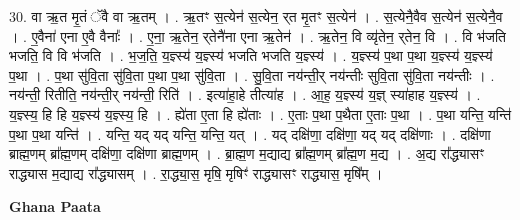 \documentclass[17pt]{extarticle}
\begin{document}
30. वा ऋ॒त मृ॒तं ॅवै वा ऋ॒तम् । . ऋ॒तꣳ स॒त्येन॑ स॒त्येन॒ र्‌त मृ॒तꣳ स॒त्येन॑ । . स॒त्येनै॒वैव स॒त्येन॑ स॒त्येनै॒व । . ए॒वैना॑ एना ए॒वै वैनाः᳚ । . ए॒ना॒ ऋ॒तेन॒ र्‌तेनै॑ना एना ऋ॒तेन॑ । . ऋ॒तेन॒ वि व्यृ॑तेन॒ र्‌तेन॒ वि । . वि भ॑जति भजति॒ वि वि भ॑जति । . भ॒ज॒ति॒ य॒ज्ञ्स्य॑ य॒ज्ञ्स्य॑ भजति भजति य॒ज्ञ्स्य॑ । . य॒ज्ञ्स्य॑ प॒था प॒था य॒ज्ञ्स्य॑ य॒ज्ञ्स्य॑ प॒था । . प॒था सु॑वि॒ता सु॑वि॒ता प॒था प॒था सु॑वि॒ता । . सु॒वि॒ता नय॑न्ती॒र् नय॑न्तीः सुवि॒ता सु॑वि॒ता नय॑न्तीः । . नय॑न्ती॒ रितीति॒ नय॑न्ती॒र् नय॑न्ती॒ रिति॑ । . इत्या॑हा॒हे तीत्या॑ह । . आ॒ह॒ य॒ज्ञ्स्य॑ य॒ज्ञ् स्या॑हाह य॒ज्ञ्स्य॑ । . य॒ज्ञ्स्य॒ हि हि य॒ज्ञ्स्य॑ य॒ज्ञ्स्य॒ हि । . ह्ये॑ता ए॒ता हि ह्ये॑ताः । . ए॒ताः प॒था प॒थैता ए॒ताः प॒था । . प॒था यन्ति॒ यन्ति॑ प॒था प॒था यन्ति॑ । . यन्ति॒ यद् यद् यन्ति॒ यन्ति॒ यत् । . यद् दक्षि॑णा॒ दक्षि॑णा॒ यद् यद् दक्षि॑णाः । . दक्षि॑णा ब्राह्म॒णम् ब्रा᳚ह्म॒णम् दक्षि॑णा॒ दक्षि॑णा ब्राह्म॒णम् । . ब्रा॒ह्म॒ण म॒द्याद्य ब्रा᳚ह्म॒णम् ब्रा᳚ह्म॒ण म॒द्य । . अ॒द्य रा᳚द्ध्यासꣳ राद्ध्यास म॒द्याद्य रा᳚द्ध्यासम् । . रा॒द्ध्या॒स॒ मृषि॒ मृषिꣳ॑ राद्ध्यासꣳ राद्ध्यास॒ मृषि᳚म् । \newline

\textbf{Ghana Paata } \newline
\end{document}
